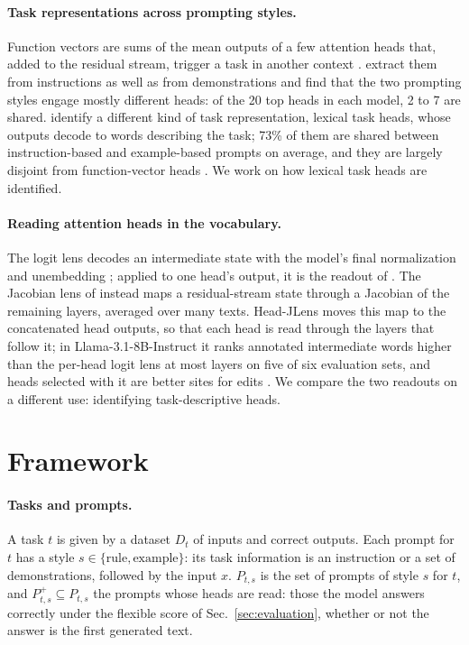 \documentclass[11pt,a4paper]{article}
\begin{document}
\paragraph{Task representations across prompting styles.} Function vectors are sums of the mean outputs of a few attention heads that, added to the residual stream, trigger a task in another context \citep{todd2024function}. \citet{davidson2025different} extract them from instructions as well as from demonstrations and find that the two prompting styles engage mostly different heads: of the 20 top heads in each model, 2 to 7 are shared. \citet{yang2026shared} identify a different kind of task representation, lexical task heads, whose outputs decode to words describing the task; 73\% of them are shared between instruction-based and example-based prompts on average, and they are largely disjoint from function-vector heads \citep[App.~I]{yang2026shared}. We work on how lexical task heads are identified.

\paragraph{Reading attention heads in the vocabulary.} The logit lens decodes an intermediate state with the model's final normalization and unembedding \citep{nostalgebraist2020logitlens}; applied to one head's output, it is the readout of \citet{yang2026shared}. The Jacobian lens of \citet{gurnee2026workspace} instead maps a residual-stream state through a Jacobian of the remaining layers, averaged over many texts. Head-JLens moves this map to the concatenated head outputs, so that each head is read through the layers that follow it; in Llama-3.1-8B-Instruct it ranks annotated intermediate words higher than the per-head logit lens at most layers on five of six evaluation sets, and heads selected with it are better sites for edits \citep{merlo2026headjlens}. We compare the two readouts on a different use: identifying task-descriptive heads.

\section{Framework}\label{sec:framework}
\paragraph{Tasks and prompts.} A task $t$ is given by a dataset $D_t$ of inputs and correct outputs. Each prompt for $t$ has a style $s\in\{\text{rule},\text{example}\}$: its task information is an instruction or a set of demonstrations, followed by the input $x$. $P_{t,s}$ is the set of prompts of style $s$ for $t$, and $P^{+}_{t,s}\subseteq P_{t,s}$ the prompts whose heads are read: those the model answers correctly under the flexible score of Sec.~\ref{sec:evaluation}, whether or not the answer is the first generated text.
\end{document}
